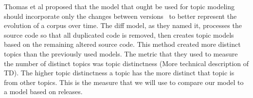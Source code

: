 Thomas et al proposed that the model that ought be used for topic modeling should incorporate only the changes between versions~\cite{Thomas-etal:2011} to better represent the evolution of a corpus over time.
The diff model, as they named it, processes the source code so that all duplicated code is removed, then creates topic models based on the remaining altered source code.
This method created more distinct topics than the previously used models.
The metric that they used to measure the number of distinct topics was topic distinctness (More technical description of TD).
The higher topic distinctness a topic has the more distinct that topic is from other topics.
This is the measure that we will use to compare our model to a model based on releases.

